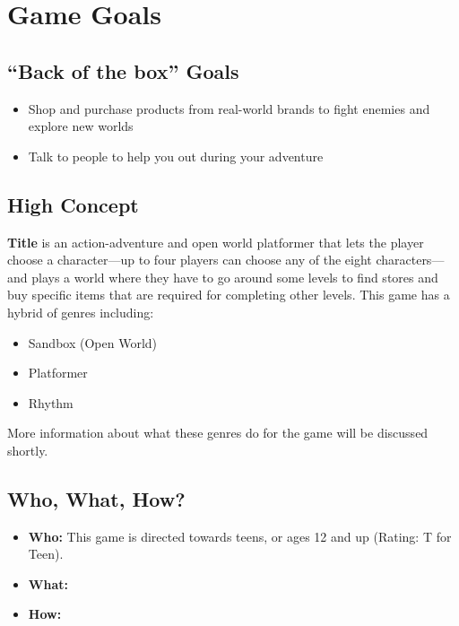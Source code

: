 \documentclass[12pt]{article}
\begin{document}
\section{Game Goals}
\subsection*{``Back of the box'' Goals}
\begin{addmargin}[5mm]{0em}
\begin{itemize}[noitemsep]
\item Shop and purchase products from real-world brands to fight enemies and explore new worlds
\item Talk to people to help you out during your adventure
\end{itemize}
\end{addmargin}
\subsection*{High Concept}
\noindent \textbf{Title} is an action-adventure and open world platformer that lets the player choose a character---up to four players can choose any of the eight characters---and plays a world where they have to go around some levels to find stores and buy specific items that are required for completing other levels. \newline \newline
This game has a hybrid of genres including:
\begin{addmargin}[10mm]{0em}
\begin{itemize}[noitemsep]
\item Sandbox (Open World)
\item Platformer
\item Rhythm
\end{itemize}
\end{addmargin}
More information about what these genres do for the game will be discussed shortly.
\subsection*{Who, What, How?}
\begin{addmargin}[5mm]{0em}
\begin{itemize}[noitemsep]
\item \textbf{Who:} This game is directed towards teens, or ages 12 and up (Rating: T for Teen).
\item \textbf{What:} 
\item \textbf{How:} 
\end{itemize}
\end{addmargin}
\end{document}
